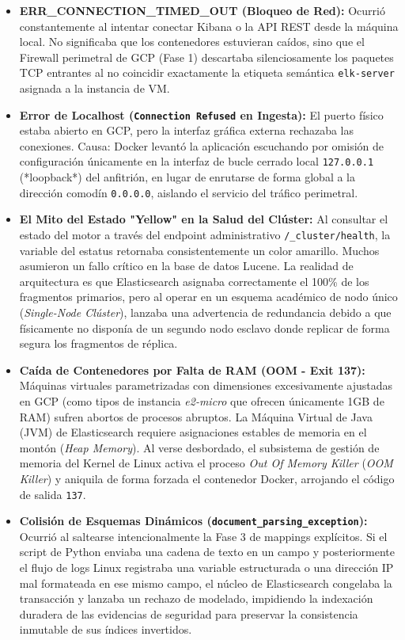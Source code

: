 \documentclass[
  coursetitle={Cómputo Nube y Tecnologías Emergentes},
  coursehours={96},
  coursedate={Verano 2026},
  doctype={Guía de Laboratorio Práctico},
  otherlangs={english,french},
  authorname={Lázaro},
  authorsurname={Bustio-Martínez},
  authortitle={PhD},
  role={Profesor Investigador},
  email={lbustio@inaoe.mx},
  phone={5559504000},
  ext={7459},
  institution={Instituto Nacional de Astrofísica, Óptica y Electrónica (INAOE)},
  department={Maestría en Ciencias en Tecnologías de Seguridad},
  address={Luis Enrique Erro 1, Sta. Ma. Tonantzintla, San Andrés Cholula, CP 72840, Puebla, México},
  margin={0.5in}
]{../../lbustio_lecture_notes}
\begin{document}
\begin{itemize}
    \item \textbf{ERR\_CONNECTION\_TIMED\_OUT (Bloqueo de Red):} Ocurrió constantemente al intentar conectar Kibana o la API REST desde la máquina local. No significaba que los contenedores estuvieran caídos, sino que el Firewall perimetral de GCP (Fase 1) descartaba silenciosamente los paquetes TCP entrantes al no coincidir exactamente la etiqueta semántica \texttt{elk-server} asignada a la instancia de VM.
    \item \textbf{Error de Localhost (\texttt{Connection Refused} en Ingesta):} El puerto físico estaba abierto en GCP, pero la interfaz gráfica externa rechazaba las conexiones. Causa: Docker levantó la aplicación escuchando por omisión de configuración únicamente en la interfaz de bucle cerrado local \texttt{127.0.0.1} (*loopback*) del anfitrión, en lugar de enrutarse de forma global a la dirección comodín \texttt{0.0.0.0}, aislando el servicio del tráfico perimetral.
    \item \textbf{El Mito del Estado "Yellow" en la Salud del Clúster:} Al consultar el estado del motor a través del endpoint administrativo \texttt{/\_cluster/health}, la variable del estatus retornaba consistentemente un color amarillo. Muchos asumieron un fallo crítico en la base de datos Lucene. La realidad de arquitectura es que Elasticsearch asignaba correctamente el 100\% de los fragmentos primarios, pero al operar en un esquema académico de nodo único (\textit{Single-Node Clúster}), lanzaba una advertencia de redundancia debido a que físicamente no disponía de un segundo nodo esclavo donde replicar de forma segura los fragmentos de réplica.
    \item \textbf{Caída de Contenedores por Falta de RAM (OOM - Exit 137):} Máquinas virtuales parametrizadas con dimensiones excesivamente ajustadas en GCP (como tipos de instancia \textit{e2-micro} que ofrecen únicamente 1GB de RAM) sufren abortos de procesos abruptos. La Máquina Virtual de Java (JVM) de Elasticsearch requiere asignaciones estables de memoria en el montón (\textit{Heap Memory}). Al verse desbordado, el subsistema de gestión de memoria del Kernel de Linux activa el proceso \textit{Out Of Memory Killer} (\textit{OOM Killer}) y aniquila de forma forzada el contenedor Docker, arrojando el código de salida \texttt{137}.
    \item \textbf{Colisión de Esquemas Dinámicos (\texttt{document\_parsing\_exception}):} Ocurrió al saltearse intencionalmente la Fase 3 de mappings explícitos. Si el script de Python enviaba una cadena de texto en un campo y posteriormente el flujo de logs Linux registraba una variable estructurada o una dirección IP mal formateada en ese mismo campo, el núcleo de Elasticsearch congelaba la transacción y lanzaba un rechazo de modelado, impidiendo la indexación duradera de las evidencias de seguridad para preservar la consistencia inmutable de sus índices invertidos.
\end{itemize}
\end{document}
